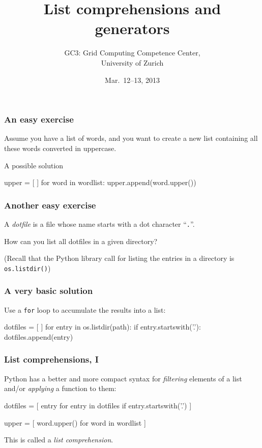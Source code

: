 \documentclass[english,serif,mathserif,xcolor=pdftex,dvipsnames,table]{beamer}
\title[Part 7]{%
  List comprehensions and generators
}
\author[GC3]{%
  GC3: Grid Computing Competence Center, \\
  University of Zurich
}
\date{Mar.~12--13, 2013}
\begin{document}
\maketitle

\begin{frame}[fragile]
  \frametitle{An easy exercise}
  Assume you have a list of words, and you want to create a new list
  containing all these words converted in uppercase.

\pause
\+
A possible solution
\begin{python}
upper = [ ]
for word in wordlist:
  upper.append(word.upper())
\end{python}
\end{frame}


\begin{frame}
  \frametitle{Another easy exercise}
  A \emph{dotfile} is a file whose name starts with a dot character
  ``\texttt{.}''.

  \+
  How can you list all dotfiles in a given directory?

  \+
  (Recall that the Python library call for listing the entries in a
  directory is \texttt{os.listdir()})
\end{frame}


\begin{frame}[fragile]
  \frametitle{A very basic solution}
  Use a \lstinline|for| loop to accumulate the results into a list:
  \begin{python}
dotfiles = [ ]
for entry in os.listdir(path):
  if entry.startswith('.'):
    dotfiles.append(entry)
  \end{python}
\end{frame}


\begin{frame}[fragile]
  \frametitle{List comprehensions, I}
  Python has a better and more compact syntax for \emph{filtering} elements
  of a list and/or \emph{applying} a function to them:
  \begin{python}
dotfiles = [ entry for entry in dotfiles 
             if entry.startswith('.') ]
  \end{python}
\+
\begin{python}
upper = [ word.upper() for word in wordlist ]
\end{python}
  
  \+ 
  This is called a \emph{list comprehension}.
\end{frame}
\end{document}
